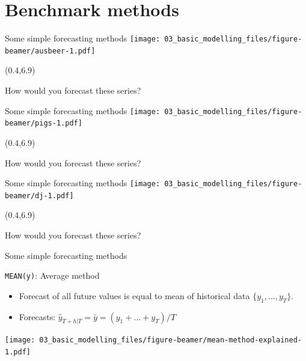 \documentclass[
  14pt,
  ignorenonframetext,
  aspectratio=169,
]{beamer}
\providecommand{\tightlist}{%
  \setlength{\itemsep}{0pt}\setlength{\parskip}{0pt}}\usepackage{longtable,booktabs,array}
\begin{document}
\hypertarget{benchmark-methods}{%
\section{Benchmark methods}\label{benchmark-methods}}

\begin{frame}{Some simple forecasting methods}
\protect\hypertarget{some-simple-forecasting-methods}{}
\texttt{[image: 03\_basic\_modelling\_files/figure-beamer/ausbeer-1.pdf]}

\begin{textblock}{7}(0.4,6.9)
\begin{alertblock}{}
\small{How would you forecast these series?}
\end{alertblock}
\end{textblock}
\end{frame}

\begin{frame}{Some simple forecasting methods}
\protect\hypertarget{some-simple-forecasting-methods-1}{}
\texttt{[image: 03\_basic\_modelling\_files/figure-beamer/pigs-1.pdf]}

\begin{textblock}{7}(0.4,6.9)
\begin{alertblock}{}
\small{How would you forecast these series?}
\end{alertblock}
\end{textblock}
\end{frame}

\begin{frame}{Some simple forecasting methods}
\protect\hypertarget{some-simple-forecasting-methods-2}{}
\texttt{[image: 03\_basic\_modelling\_files/figure-beamer/dj-1.pdf]}

\begin{textblock}{7}(0.4,6.9)
\begin{alertblock}{}
\small{How would you forecast these series?}
\end{alertblock}
\end{textblock}
\end{frame}

\begin{frame}[fragile]{Some simple forecasting methods}
\protect\hypertarget{some-simple-forecasting-methods-3}{}
\fontsize{13}{14}\sf

\begin{block}{\texttt{MEAN(y)}: Average method}
\protect\hypertarget{meany-average-method}{}
\begin{itemize}
\tightlist
\item
  Forecast of all future values is equal to mean of historical data
  \(\{y_1,\dots,y_T\}\).
\item
  Forecasts: \(\hat{y}_{T+h|T} = \bar{y} = (y_1+\dots+y_T)/T\)
\end{itemize}

\texttt{[image: 03\_basic\_modelling\_files/figure-beamer/mean-method-explained-1.pdf]}
\end{block}
\end{frame}
\end{document}
